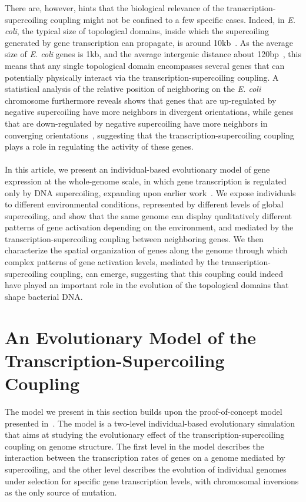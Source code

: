 There are, however, hints that the biological relevance of the transcription-supercoiling coupling might not be confined to a few specific cases.
Indeed, in \emph{E. coli}, the typical size of topological domains, inside which the supercoiling generated by gene transcription can propagate, is around 10kb~\citep{postow2004}.
As the average size of \emph{E. coli} genes is 1kb, and the average intergenic distance about 120bp~\citep{blattner1997}, this means that any single topological domain encompasses several genes that can potentially physically interact via the transcription-supercoiling coupling.
A statistical analysis of the relative position of neighboring on the \emph{E. coli} chromosome furthermore reveals shows that genes that are up-regulated by negative supercoiling have more neighbors in divergent orientations, while genes that are down-regulated by negative supercoiling have more neighbors in converging orientations~\citep{sobetzko2016}, suggesting that the transcription-supercoiling coupling plays a role in regulating the activity of these genes.

\paragraph{}

In this article, we present an individual-based evolutionary model of gene expression at the whole-genome scale, in which gene transcription is regulated only by DNA supercoiling, expanding upon earlier work~\citep{grohens2021}.
We expose individuals to different environmental conditions, represented by different levels of global supercoiling, and show that the same genome can display qualitatively different patterns of gene activation depending on the environment, and mediated by the transcription-supercoiling coupling between neighboring genes.
We then characterize the spatial organization of genes along the genome through which complex patterns of gene activation levels, mediated by the transcription-supercoiling coupling, can emerge, suggesting that this coupling could indeed have played an important role in the evolution of the topological domains that shape bacterial DNA.


\section{An Evolutionary Model of the Transcription-Supercoiling Coupling}
\label{sec:model}

The model we present in this section builds upon the proof-of-concept model presented in~\cite{grohens2021}.
The model is a two-level individual-based evolutionary simulation that aims at studying the evolutionary effect of the transcription-supercoiling coupling on genome structure.
The first level in the model describes the interaction between the transcription rates of genes on a genome mediated by supercoiling, and the other level describes the evolution of individual genomes under selection for specific gene transcription levels, with chromosomal inversions as the only source of mutation.

